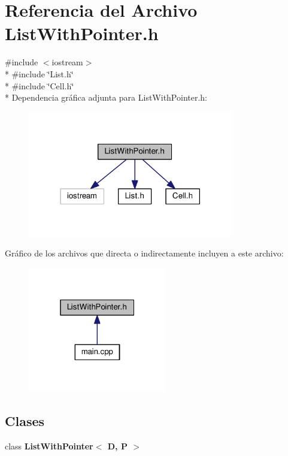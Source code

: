 \section{Referencia del Archivo List\-With\-Pointer.\-h}
\label{_list_with_pointer_8h}
{\ttfamily \#include $<$iostream$>$}\\*
{\ttfamily \#include \char`\"{}List.\-h\char`\"{}}\\*
{\ttfamily \#include \char`\"{}Cell.\-h\char`\"{}}\\*
Dependencia gráfica adjunta para List\-With\-Pointer.\-h\-:\nopagebreak
\begin{figure}[H]
\begin{center}
\leavevmode
\includegraphics[width=254pt]{_list_with_pointer_8h__incl}
\end{center}
\end{figure}
Gráfico de los archivos que directa o indirectamente incluyen a este archivo\-:\nopagebreak
\begin{figure}[H]
\begin{center}
\leavevmode
\includegraphics[width=172pt]{_list_with_pointer_8h__dep__incl}
\end{center}
\end{figure}
\subsection*{Clases}
\begin{DoxyCompactItemize}
\item 
class {\bf List\-With\-Pointer$<$ D, P $>$}
\end{DoxyCompactItemize}

